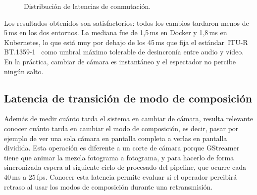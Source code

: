 \begin{figure}[H]
  \centering
  \caption{Distribución de latencias de conmutación.}
  \label{fig:latencia}
\end{figure}

Los resultados obtenidos son satisfactorios: todos los cambios tardaron menos de 5\,ms en
los dos entornos. La mediana fue de 1{,}5\,ms en Docker y 1{,}8\,ms en
Kubernetes, lo que está muy por debajo de los 45\,ms que fija el
estándar~\ac{ITU-R} BT.1359-1~\cite{itur_bt1359_1998} como umbral máximo
tolerable de desincronía entre audio y vídeo. En la práctica, cambiar de cámara es
instantáneo y el espectador no percibe ningún salto.

\subsection{Latencia de transición de modo de composición}
\label{sec:latencia_transicion}

Además de medir cuánto tarda el sistema en cambiar de cámara, resulta relevante
conocer cuánto tarda en cambiar el modo de composición, es decir, pasar por ejemplo de
ver una sola cámara en pantalla completa a verlas en pantalla dividida. Esta
operación es diferente a un corte de cámara porque GStreamer tiene que animar
la mezcla fotograma a fotograma, y para hacerlo de forma sincronizada espera al
siguiente ciclo de procesado del pipeline, que ocurre cada 40\,ms a 25\,fps.
Conocer esta latencia permite evaluar si el operador percibirá retraso
al usar los modos de composición durante una retransmisión.

